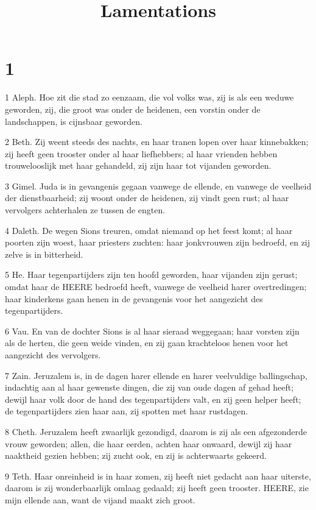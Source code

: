 

\title{Lamentations}



\chapter{1}

\par 1 Aleph. Hoe zit die stad zo eenzaam, die vol volks was, zij is als een weduwe geworden, zij, die groot was onder de heidenen, een vorstin onder de landschappen, is cijnsbaar geworden.
\par 2 Beth. Zij weent steeds des nachts, en haar tranen lopen over haar kinnebakken; zij heeft geen trooster onder al haar liefhebbers; al haar vrienden hebben trouwelooslijk met haar gehandeld, zij zijn haar tot vijanden geworden.
\par 3 Gimel. Juda is in gevangenis gegaan vanwege de ellende, en vanwege de veelheid der dienstbaarheid; zij woont onder de heidenen, zij vindt geen rust; al haar vervolgers achterhalen ze tussen de engten.
\par 4 Daleth. De wegen Sions treuren, omdat niemand op het feest komt; al haar poorten zijn woest, haar priesters zuchten: haar jonkvrouwen zijn bedroefd, en zij zelve is in bitterheid.
\par 5 He. Haar tegenpartijders zijn ten hoofd geworden, haar vijanden zijn gerust; omdat haar de HEERE bedroefd heeft, vanwege de veelheid harer overtredingen; haar kinderkens gaan henen in de gevangenis voor het aangezicht des tegenpartijders.
\par 6 Vau. En van de dochter Sions is al haar sieraad weggegaan; haar vorsten zijn als de herten, die geen weide vinden, en zij gaan krachteloos henen voor het aangezicht des vervolgers.
\par 7 Zain. Jeruzalem is, in de dagen harer ellende en harer veelvuldige ballingschap, indachtig aan al haar gewenste dingen, die zij van oude dagen af gehad heeft; dewijl haar volk door de hand des tegenpartijders valt, en zij geen helper heeft; de tegenpartijders zien haar aan, zij spotten met haar rustdagen.
\par 8 Cheth. Jeruzalem heeft zwaarlijk gezondigd, daarom is zij als een afgezonderde vrouw geworden; allen, die haar eerden, achten haar onwaard, dewijl zij haar naaktheid gezien hebben; zij zucht ook, en zij is achterwaarts gekeerd.
\par 9 Teth. Haar onreinheid is in haar zomen, zij heeft niet gedacht aan haar uiterste, daarom is zij wonderbaarlijk omlaag gedaald; zij heeft geen trooster. HEERE, zie mijn ellende aan, want de vijand maakt zich groot.
